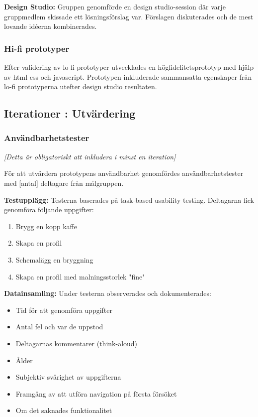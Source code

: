 \textbf{Design Studio:} Gruppen genomförde en design studio-session där varje gruppmedlem skissade ett lösningsförslag var. Förslagen diskuterades och de mest lovande idéerna kombinerades. %



\subsubsection{Hi-fi prototyper}

Efter validering av lo-fi prototyper utvecklades en högfidelitetsprototyp med hjälp av html css och javascript. Prototypen inkluderade sammansatta egenskaper från lo-fi prototyperna utefter design studio resultaten.


\subsection{Iterationer : Utvärdering} %

\subsubsection{Användbarhetstester}

\textit{[Detta är obligatoriskt att inkludera i minst en iteration]}

För att utvärdera prototypens användbarhet genomfördes användbarhetstester med [antal] deltagare från målgruppen.

\textbf{Testupplägg:} Testerna baserades på task-based usability testing. Deltagarna fick genomföra följande uppgifter:
\begin{enumerate}
    \item Brygg en kopp kaffe
    \item Skapa en profil 
    \item Schemalägg en bryggning
    \item Skapa en profil med malningsstorlek "fine"
\end{enumerate}

\textbf{Datainsamling:} Under testerna observerades och dokumenterades:
\begin{itemize}
    \item Tid för att genomföra uppgifter
    \item Antal fel och var de uppstod
    \item Deltagarnas kommentarer (think-aloud)
    \item Ålder 
    \item Subjektiv svårighet av uppgifterna 
    \item Framgång av att utföra navigation på första försöket 
    \item Om det saknades funktionalitet
\end{itemize}

